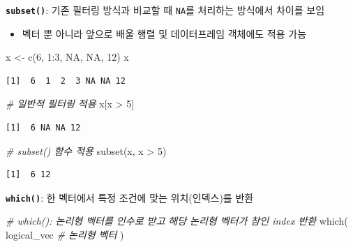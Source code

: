 \documentclass[
  11pt,
]{krantz}
\newenvironment{Shaded}{\begin{snugshade}}{\end{snugshade}}
\newcommand{\CommentTok}[1]{\textcolor[rgb]{0.37,0.37,0.37}{\textit{#1}}}
\newcommand{\ConstantTok}[1]{\textcolor[rgb]{0,0,0}{#1}}
\newcommand{\DecValTok}[1]{\textcolor[rgb]{0.06,0.06,0.06}{#1}}
\newcommand{\FunctionTok}[1]{\textcolor[rgb]{0,0,0}{#1}}
\newcommand{\NormalTok}[1]{#1}
\newcommand{\OtherTok}[1]{\textcolor[rgb]{0.37,0.37,0.37}{#1}}
\newcommand{\SpecialCharTok}[1]{\textcolor[rgb]{0,0,0}{#1}}
\providecommand{\tightlist}{%
  \setlength{\itemsep}{0pt}\setlength{\parskip}{0pt}}
\begin{document}
\textbf{\texttt{subset()}}: 기존 필터링 방식과 비교할 때 \texttt{NA}를 처리하는 방식에서 차이를 보임

\begin{itemize}
\tightlist
\item
  벡터 뿐 아니라 앞으로 배울 행렬 및 데이터프레임 객체에도 적용 가능
\end{itemize}

\footnotesize

\begin{Shaded}
\begin{Highlighting}[]
\NormalTok{x }\OtherTok{\textless{}{-}} \FunctionTok{c}\NormalTok{(}\DecValTok{6}\NormalTok{, }\DecValTok{1}\SpecialCharTok{:}\DecValTok{3}\NormalTok{, }\ConstantTok{NA}\NormalTok{, }\ConstantTok{NA}\NormalTok{, }\DecValTok{12}\NormalTok{)}
\NormalTok{x}
\end{Highlighting}
\end{Shaded}

\begin{verbatim}
[1]  6  1  2  3 NA NA 12
\end{verbatim}

\begin{Shaded}
\begin{Highlighting}[]
\CommentTok{\# 일반적 필터링 적용 }
\NormalTok{x[x }\SpecialCharTok{\textgreater{}} \DecValTok{5}\NormalTok{]}
\end{Highlighting}
\end{Shaded}

\begin{verbatim}
[1]  6 NA NA 12
\end{verbatim}

\begin{Shaded}
\begin{Highlighting}[]
\CommentTok{\# subset() 함수 적용}
\FunctionTok{subset}\NormalTok{(x, x }\SpecialCharTok{\textgreater{}} \DecValTok{5}\NormalTok{)}
\end{Highlighting}
\end{Shaded}

\begin{verbatim}
[1]  6 12
\end{verbatim}

\normalsize

\textbf{\texttt{which()}}: 한 벡터에서 특정 조건에 맞는 위치(인덱스)를 반환

\footnotesize

\begin{Shaded}
\begin{Highlighting}[]
\CommentTok{\# which(): 논리형 벡터를 인수로 받고 해당 논리형 벡터가 참인 index 반환}
\FunctionTok{which}\NormalTok{(}
\NormalTok{  logical\_vec }\CommentTok{\# 논리형 벡터}
\NormalTok{)}
\end{Highlighting}
\end{Shaded}
\end{document}
